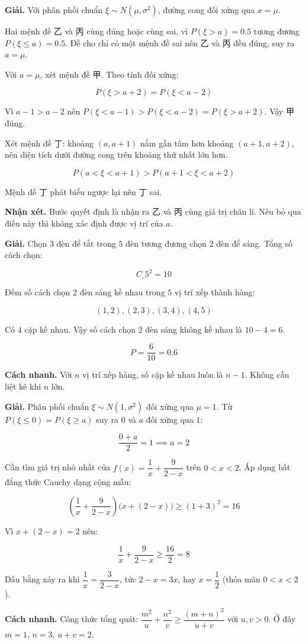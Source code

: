 \documentclass[11pt, a4paper]{article}
\begin{document}
\begin{dapan}[1 — Đáp án D]
\textbf{Giải.} Với phân phối chuẩn $\xi \sim N(\mu, \sigma^2)$, đường cong đối xứng qua $x = \mu$.

Hai mệnh đề 乙 và 丙 cùng đúng hoặc cùng sai, vì $P(\xi > a) = 0.5$ tương đương $P(\xi \le a) = 0.5$. Đề cho chỉ có một mệnh đề sai nên 乙 và 丙 đều đúng, suy ra $a = \mu$.

Với $a = \mu$, xét mệnh đề 甲. Theo tính đối xứng:

$$P(\xi > a + 2) = P(\xi < a - 2)$$

Vì $a - 1 > a - 2$ nên $P(\xi < a - 1) > P(\xi < a - 2) = P(\xi > a + 2)$. Vậy 甲 đúng.

Xét mệnh đề 丁: khoảng $(a, a+1)$ nằm gần tâm hơn khoảng $(a+1, a+2)$, nên diện tích dưới đường cong trên khoảng thứ nhất lớn hơn.

$$P(a < \xi < a+1) > P(a+1 < \xi < a+2)$$

Mệnh đề 丁 phát biểu ngược lại nên 丁 sai.

\textbf{Nhận xét.} Bước quyết định là nhận ra 乙 và 丙 cùng giá trị chân lí. Nếu bỏ qua điều này thì không xác định được vị trí của $a$.
\end{dapan}

\begin{dapan}[2 — Đáp án C]
\textbf{Giải.} Chọn $3$ đèn để tắt trong $5$ đèn tương đương chọn $2$ đèn để sáng. Tổng số cách chọn:

$$C\_5^2 = 10$$

Đếm số cách chọn $2$ đèn sáng kề nhau trong $5$ vị trí xếp thành hàng:

$$(1,2), (2,3), (3,4), (4,5)$$

Có $4$ cặp kề nhau. Vậy số cách chọn $2$ đèn sáng không kề nhau là $10 - 4 = 6$.

$$P = \frac{6}{10} = 0.6$$

\textbf{Cách nhanh.} Với $n$ vị trí xếp hàng, số cặp kề nhau luôn là $n - 1$. Không cần liệt kê khi $n$ lớn.
\end{dapan}

\begin{dapan}[3 — Đáp án B]
\textbf{Giải.} Phân phối chuẩn $\xi \sim N(1, \sigma^2)$ đối xứng qua $\mu = 1$. Từ $P(\xi \le 0) = P(\xi \ge a)$ suy ra $0$ và $a$ đối xứng qua $1$:

$$\frac{0 + a}{2} = 1 \implies a = 2$$

Cần tìm giá trị nhỏ nhất của $f(x) = \dfrac{1}{x} + \dfrac{9}{2-x}$ trên $0 < x < 2$. Áp dụng bất đẳng thức Cauchy dạng cộng mẫu:

$$\left(\frac{1}{x} + \frac{9}{2-x}\right)\big(x + (2-x)\big) \ge (1 + 3)^2 = 16$$

Vì $x + (2-x) = 2$ nên:

$$\frac{1}{x} + \frac{9}{2-x} \ge \frac{16}{2} = 8$$

Dấu bằng xảy ra khi $\dfrac{1}{x} = \dfrac{3}{2-x}$, tức $2 - x = 3x$, hay $x = \dfrac{1}{2}$ (thỏa mãn $0 < x < 2$).

\textbf{Cách nhanh.} Công thức tổng quát: $\dfrac{m^2}{u} + \dfrac{n^2}{v} \ge \dfrac{(m+n)^2}{u+v}$ với $u, v > 0$. Ở đây $m = 1$, $n = 3$, $u + v = 2$.
\end{dapan}
\end{document}
